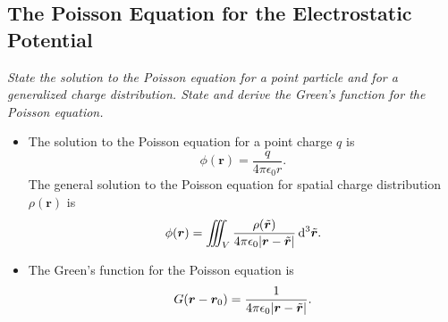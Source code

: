 \documentclass[11pt, a4paper]{article}
\newcommand{\diff}{\mathop{}\!\mathrm{d}} %
\newcommand{\dtr}{\diff^{3} \tilde{\r}}  %
\renewcommand{\vec}[1]{\bm{#1}} %
\renewcommand{\r}{\vec{r}}
\newcommand{\ee}{\epsilon_{0}}  %
\begin{document}
\subsection{The Poisson Equation for the Electrostatic Potential}
\textit{State the solution to the Poisson equation for a point particle and for a generalized charge distribution. State and derive the Green's function for the Poisson equation.}

\begin{itemize}
    \item The solution to the Poisson equation for a point charge $ q $ is
    \begin{equation*}
        \phi(\r) = \frac{q}{4\pi \ee r}.
    \end{equation*}
    The general solution to the Poisson equation for spatial charge distribution $ \rho(\r) $ is
    \begin{equation*}
        \phi(\r) = \iiint_{V} \frac{\rho(\tilde{\r})}{4 \pi \ee \abs{\r - \tilde{\r}}} \dtr.
    \end{equation*}

    \item The Green's function for the Poisson equation is
    \begin{equation*}
        G(\r- \r_{0}) = \frac{1}{4\pi \ee \abs{\r - \tilde{\r}}}.
    \end{equation*}
    
\end{itemize}
\end{document}
